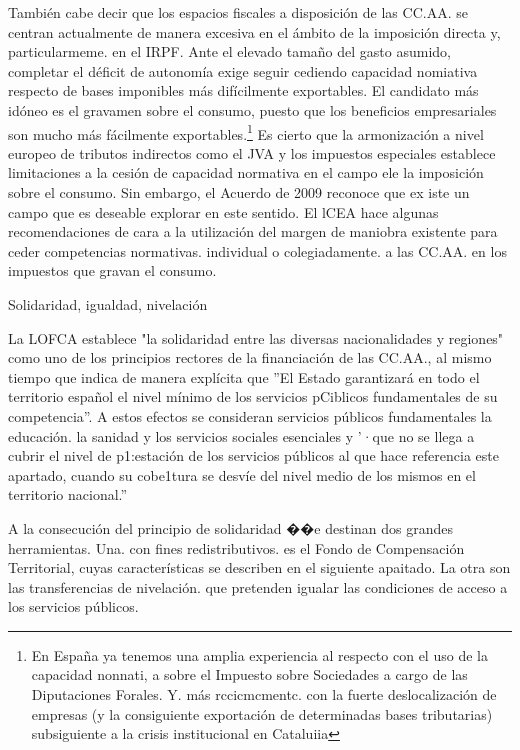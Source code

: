 \documentclass[10pt,a4paper]{article}
\begin{document}
También cabe decir que los espacios fiscales a disposición de las CC.AA. se centran actualmente de manera excesiva en el ámbito de la imposición directa y, particularmeme. en el IRPF. Ante el elevado tamaño del gasto asumido, completar el déficit de autonomía exige seguir cediendo capacidad nomiativa respecto de bases imponibles más difícilmente exportables. El candidato más idóneo es el gravamen sobre el consumo, puesto que los beneficios empresariales son mucho más fácilmente exportables.\footnote{%
    En España ya tenemos una amplia experiencia al respecto con el uso de la capacidad nonnati, a sobre el Impuesto sobre Sociedades a cargo de las Diputaciones Forales. Y. más rccicmcmentc. con la fuerte deslocalización de empresas (y la consiguiente exportación de determinadas bases tributarias) subsiguiente a la crisis institucional en Cataluiia
} Es cierto que la armonización a nivel europeo de tributos indirectos como el JVA y los impuestos especiales establece limitaciones a la cesión de capacidad normativa en el campo ele la imposición sobre el consumo. Sin embargo, el Acuerdo de 2009 reconoce que ex iste un campo que es deseable explorar en este sentido. El lCEA hace algunas recomendaciones de cara a la utilización del margen de maniobra existente para ceder competencias normativas. individual o colegiadamente. a las CC.AA. en los impuestos que gravan el consumo.

Solidaridad, igualdad, nivelación

La LOFCA establece "la solidaridad entre las diversas nacionalidades y regiones" como uno de los principios rectores de la financiación de las CC.AA., al mismo tiempo que indica de manera explícita que ''El Estado garantizará en todo el territorio español el nivel mínimo de los servicios pCiblicos fundamentales de su competencia''. A estos efectos se consideran servicios públicos fundamentales la educación. la sanidad y los servicios sociales esenciales y '·que no se llega a cubrir el nivel de p1:estación de los servicios públicos al que hace referencia este apartado, cuando su cobe1tura se desvíe del nivel medio de los mismos en el territorio nacional.''

A la consecución del principio de solidaridad ��e destinan dos grandes herramientas. Una. con fines redistributivos. es el Fondo de Compensación Territorial, cuyas características se describen en el siguiente apaitado. La otra son las transferencias de nivelación. que pretenden igualar las condiciones de acceso a los servicios públicos.
\end{document}
